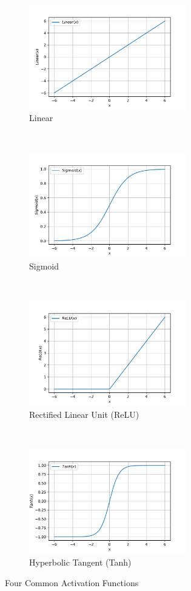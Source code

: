\begin{spacing}{1.5}
\begin{figure}[th]
    \centering
    \begin{subfigure}[b]{0.49\textwidth}
        \centering
        \includegraphics[width=2.7in, fbox]{Chapter2/linear.pdf}
        \caption{Linear}
    \end{subfigure}%
    ~
    \begin{subfigure}[b]{0.49\textwidth}
        \centering
        \includegraphics[width=2.7in, fbox]{Chapter2/sigmoid.pdf}
        \caption{Sigmoid}
    \end{subfigure}
    \\
    \begin{subfigure}[b]{0.49\textwidth}
        \centering
        \includegraphics[width=2.7in, fbox]{Chapter2/ReLu.pdf}
        \caption{Rectified Linear Unit (ReLU)}
        \label{fig:relufunc} 
    \end{subfigure}%
    ~
    \begin{subfigure}[b]{0.49\textwidth}
        \centering
        \includegraphics[width=2.7in, fbox]{Chapter2/tanh.pdf}
        \caption{Hyperbolic Tangent (Tanh)}
        \label{fig:tanhfunc} 
    \end{subfigure}
    \caption{Four Common Activation Functions}
    \label{fig:activationfunc} 
\end{figure}


\end{spacing}
